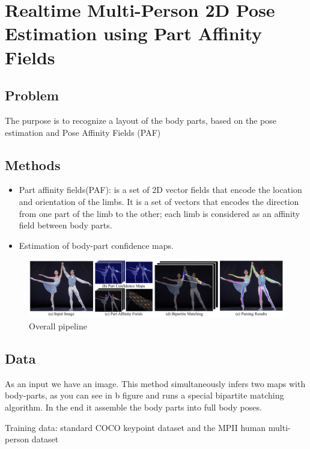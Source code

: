 \section{Realtime Multi-Person 2D Pose Estimation using Part Affinity Fields
\cite{DBLP:journals/corr/CaoSWS16}}

\subsection{Problem}
\par The purpose is to recognize a layout of the body parts, based on the pose estimation and Pose Affinity Fields (PAF)



\subsection{Methods}
 \begin{itemize}
    \item Part affinity fields(PAF): is a set of 2D vector fields that encode the location and orientation of the limbs. It is a set of vectors that encodes the direction from one part of the limb to the other; each limb is considered as an affinity field between body parts.
    \item Estimation of body-part confidence maps.
 \end{itemize}
\begin{figure}[htbp]
	\centerline{\includegraphics[scale=0.25]{fig/algoritm-ann.png}}  
	\caption{Overall pipeline}
\end{figure}

\subsection{Data}
\par As an input we have an image. This method simultaneously infers two maps with body-parts, as you can see in b figure and runs a special bipartite matching algorithm. In the end it assemble the body parts into full body poses.
\par Training data: standard COCO keypoint dataset \cite{coco2016} and the MPII human multi-person
dataset \cite{database2dhuman}
